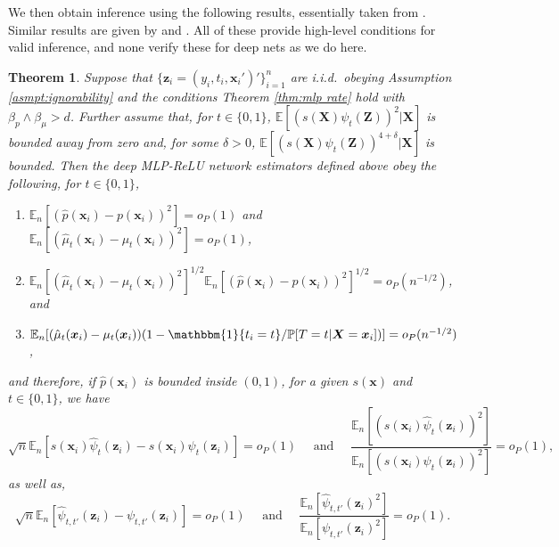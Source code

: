 \documentclass[11pt]{article}
\newtheorem{theorem}{Theorem}
\numberwithin{equation}{section}
\theoremstyle{definition}
\newcommand{\E}{\mathbb{E}}
\renewcommand{\P}{\mathbb{P}}
\newcommand{\One}{\mathbbm{1}}
\newcommand{\bz}{\bm{z}}
\newcommand{\bZ}{\bm{Z}}
\newcommand{\bx}{\bm{x}}
\newcommand{\bX}{\bm{X}}
\begin{document}
We then obtain inference using the following results, essentially taken from \cite{Farrell2015_arXiv}. Similar results are given by \cite{Belloni-etal2017_Ecma} and \cite{Chernozhukov-etal2018_EJ}. All of these provide high-level conditions for valid inference, and none verify these for deep nets as we do here.
\begin{theorem}
	\label{thm:ate}
	Suppose that $\{\bz_i = (y_i, t_i, \bx_i')'\}_{i=1}^n$ are i.i.d.\ obeying Assumption \ref{asmpt:ignorability} and the conditions Theorem \ref{thm:mlp rate} hold with $\beta_p \wedge \beta_\mu > d$. Further assume that, for $t \in \{0,1\}$, $\E[(s(\bX)\psi_t(\bZ))^2 \vert \bX]$ is bounded away from zero and, for some $\delta > 0$, $\E[(s(\bX)\psi_t(\bZ))^{4+\delta} \vert \bX]$ is bounded. Then the deep MLP-ReLU network estimators defined above obey the following, for $t \in \{0,1\}$,
		\begin{enumerate}
	
			\item $ \E_n[(\hat{p}(\bx_i) - p(\bx_i))^2]  = o_P(1)$ and $\E_n \left[ (\hat{\mu}_t(\bx_i) - \mu_t(\bx_i))^2\right]  = o_P(1)$,
	
			\item $ \E_n[ (\hat{\mu}_t(\bx_i) - \mu_t(\bx_i))^2]^{1/2}  \E_n[ (\hat{p}(\bx_i) - p(\bx_i))^2]^{1/2}    = o_P(n^{-1/2})$, and 
			
			\item $ \E_n[ (\hat{\mu}_t(\bx_i) - \mu_t(\bx_i)) (1 - \One\{t_i=t\}/ \P[T=t\vert \bX = \bx_i])]    = o_P(n^{-1/2})$,
	
		\end{enumerate}
	and therefore, if $\hat{p}(\bx_i)$ is bounded inside $(0,1)$, for a given $s(\bx)$ and $t \in \{0,1\}$, we have
	\[
		\sqrt{n} \E_n \left[ s(\bx_i)\hat{\psi}_t(\bz_i) - s(\bx_i)\psi_t(\bz_i) \right] = o_P(1)   		  \quad  		  \text{ and }  		  \quad  		\frac{\E_n[ (s(\bx_i)\hat{\psi}_t(\bz_i))^2]}{\E_n[ (s(\bx_i)\psi_t(\bz_i))^2]} = o_P(1),  
	\]
	as well as,
 	\[
 		\sqrt{n} \E_n \left[ \hat{\psi}_{t,t'}(\bz_i) - \psi_{t,t'}(\bz_i) \right] = o_P(1)   		  \quad  		  \text{ and }  		  \quad  		\frac{\E_n[ \hat{\psi}_{t,t'}(\bz_i)^2]}{\E_n[ \psi_{t,t'}(\bz_i)^2]} = o_P(1).  
 	\]	
\end{theorem}
\end{document}
